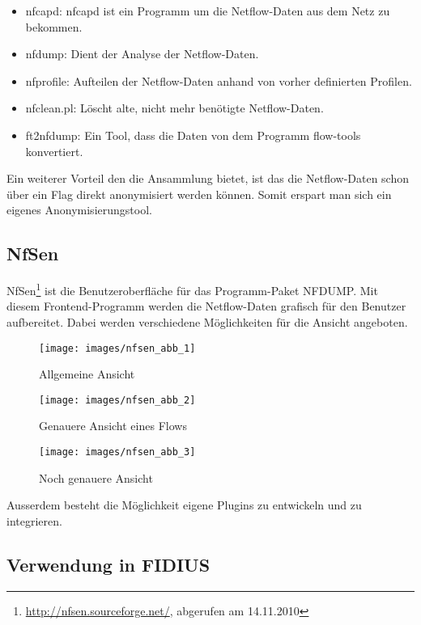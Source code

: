 \begin{itemize}
  \item nfcapd: nfcapd ist ein Programm um die Netflow-Daten aus dem Netz
  zu bekommen.
  \item nfdump: Dient der Analyse der Netflow-Daten.
  \item nfprofile: Aufteilen der Netflow-Daten anhand von vorher
  definierten Profilen.
  \item nfclean.pl: Löscht alte, nicht mehr benötigte Netflow-Daten.
  \item ft2nfdump: Ein Tool, dass die Daten von dem Programm flow-tools
  konvertiert.
\end{itemize}

Ein weiterer Vorteil den die Ansammlung bietet, ist das die Netflow-Daten
schon über ein Flag direkt anonymisiert werden können. Somit erspart man
sich ein eigenes Anonymisierungstool.

\subsection{NfSen}

NfSen\footnote{\url{http://nfsen.sourceforge.net/}, abgerufen am 14.11.2010}
ist die Benutzeroberfläche für das Programm-Paket NFDUMP. Mit diesem
Frontend-Programm werden die Netflow-Daten grafisch für den Benutzer 
aufbereitet. Dabei werden verschiedene Möglichkeiten für die Ansicht
angeboten. 

\begin{figure}
  \centering
  \texttt{[image: images/nfsen\_abb\_1]}
  \caption{Allgemeine Ansicht}
  \label{fig:netflow-security:test-nfsen-1}
\end{figure}

\begin{figure}
  \centering
  \texttt{[image: images/nfsen\_abb\_2]}
  \caption{Genauere Ansicht eines Flows}
  \label{fig:netflow-security:test-nfsen-2}
\end{figure}

\begin{figure}
  \centering
  \texttt{[image: images/nfsen\_abb\_3]}
  \caption{Noch genauere Ansicht}
  \label{fig:netflow-security:test-nfsen-3}
\end{figure}

Ausserdem besteht die Möglichkeit eigene Plugins zu entwickeln und zu
integrieren. 

\subsection{Verwendung in FIDIUS}

